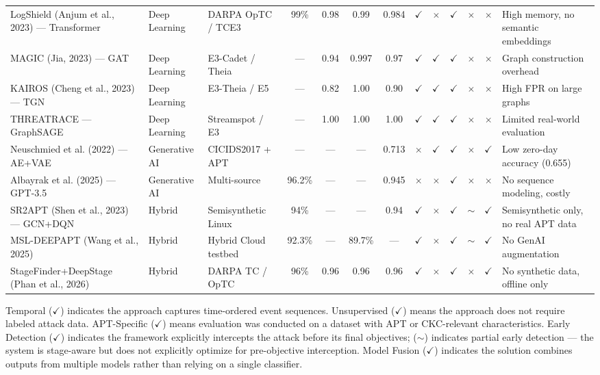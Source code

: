 \begin{table}[H]
{\begin{tabular}{|l|l|l|c|c|c|c|c|c|c|c|c|l|}
        LogShield (Anjum et al., 2023) --- Transformer & Deep Learning & DARPA OpTC / TCE3 & 99\% & 0.98 & 0.99 & 0.984 & $\checkmark$ & $\times$ & $\checkmark$ & $\times$ & $\times$ & High memory, no semantic embeddings \\
        MAGIC (Jia, 2023) --- GAT & Deep Learning & E3-Cadet / Theia & --- & 0.94 & 0.997 & 0.97 & $\checkmark$ & $\checkmark$ & $\checkmark$ & $\times$ & $\times$ & Graph construction overhead \\
        KAIROS (Cheng et al., 2023) --- TGN & Deep Learning & E3-Theia / E5 & --- & 0.82 & 1.00 & 0.90 & $\checkmark$ & $\checkmark$ & $\checkmark$ & $\times$ & $\times$ & High FPR on large graphs \\
        THREATRACE --- GraphSAGE & Deep Learning & Streamspot / E3 & --- & 1.00 & 1.00 & 1.00 & $\checkmark$ & $\checkmark$ & $\checkmark$ & $\times$ & $\times$ & Limited real-world evaluation \\
        Neuschmied et al. (2022) --- AE+VAE & Generative AI & CICIDS2017 + APT & --- & --- & --- & 0.713 & $\times$ & $\checkmark$ & $\checkmark$ & $\times$ & $\checkmark$ & Low zero-day accuracy (0.655) \\
        Albayrak et al. (2025) --- GPT-3.5 & Generative AI & Multi-source & 96.2\% & --- & --- & 0.945 & $\times$ & $\times$ & $\checkmark$ & $\times$ & $\times$ & No sequence modeling, costly \\
        SR2APT (Shen et al., 2023) --- GCN+DQN & Hybrid & Semisynthetic Linux & 94\% & --- & --- & 0.94 & $\checkmark$ & $\times$ & $\checkmark$ & $\sim$ & $\checkmark$ & Semisynthetic only, no real APT data \\
        MSL-DEEPAPT (Wang et al., 2025) & Hybrid & Hybrid Cloud testbed & 92.3\% & --- & 89.7\% & --- & $\checkmark$ & $\times$ & $\checkmark$ & $\sim$ & $\checkmark$ & No GenAI augmentation \\
        StageFinder+DeepStage (Phan et al., 2026) & Hybrid & DARPA TC / OpTC & 96\% & 0.96 & 0.96 & 0.96 & $\checkmark$ & $\times$ & $\checkmark$ & $\times$ & $\checkmark$ & No synthetic data, offline only \\
        \hline
    \end{tabular}%
    }
\end{table}

Temporal ($\checkmark$) indicates the approach captures time-ordered event sequences. Unsupervised ($\checkmark$) means the approach does not require labeled attack data. APT-Specific ($\checkmark$) means evaluation was conducted on a dataset with APT or CKC-relevant characteristics. Early Detection ($\checkmark$) indicates the framework explicitly intercepts the attack before its final objectives; ($\sim$) indicates partial early detection --- the system is stage-aware but does not explicitly optimize for pre-objective interception. Model Fusion ($\checkmark$) indicates the solution combines outputs from multiple models rather than relying on a single classifier. 

